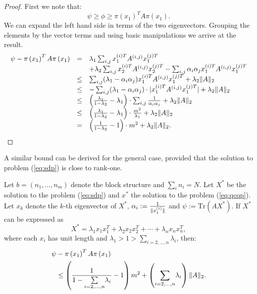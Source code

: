 \begin{proof}
First we note that: $$\psi \geq \phi \geq \pi\left(x_1\right)^T A \pi\left(x_1\right).$$
We can expand the left hand side in terms of the two eigenvectors. Grouping the
elements by the vector terms and using basic manipulations we arrive at the result.
\[
\begin{array}{rcl}
\psi - \pi\left(x_1\right)^T A \pi\left(x_1\right) & = & \lambda_1 \sum_{i,j} x_1^{(i)T} A^{(i,j)} x_1^{(j)T}  \\
& & + \lambda_2\sum_{i,j} x_2^{(i)T} A^{(i,j)} x_2^{(j)T} - \sum_{i,j} \alpha_i \alpha_j x_1^{(i)T} A^{(i,j)} x_1^{(j)T}   \\
&\leq & \sum_{i,j} (\lambda_1 - \alpha_i \alpha_j) x_1^{(i)T} A^{(i,j)} x_1^{(j)T}  + \lambda_2 \lVert A\rVert_2 \\
&\leq & -\sum_{i,j} (\lambda_1 - \alpha_i \alpha_j)\cdot |x_1^{(i)T} A^{(i,j)} x_1^{(j)T}| +  \lambda_2 \lVert A\rVert_2 \\
&\leq & \left(\frac{\lambda_1}{1-\lambda_2} - \lambda_1 \right)\cdot \sum_{i,j}  \frac{1}{\alpha_i \alpha_j} +  \lambda_2 \lVert A\rVert_2 \\
&\leq & \left(\frac{\lambda_1}{1-\lambda_2} - \lambda_1 \right)\cdot \frac{m^2}{\lambda_1} +  \lambda_2 \lVert A\rVert_2 \\
&= & \left(\frac{1}{1-\lambda_2} - 1 \right)\cdot m^2 +  \lambda_2 \lVert A\rVert_2.
\end{array}
\]
\end{proof}

A similar bound can be derived for the general case, provided that the solution to problem (\ref{eq:sdp}) is close to rank-one.
\begin{proposition}
Let $b = \left(n_1,\ldots,n_m\right)$ denote the block structure and $ \sum_i n_i = N $.
Let $X^*$ be the solution to the problem (\ref{eq:sdp}) and $x^{*}$ the solution to the problem (\ref{eq:qcqp}).
Let $x_k$ denote the $k$-th eigenvector of $X^*$,
$\alpha_i := \frac{1}{\lVert x_1^{(i)}\rVert}$ and
$\psi := \mathrm{Tr}\left(A X^{*}\right)$.
If $X^*$ can be expressed as
$$X^* = \lambda_1  x_1 x_1^T + \lambda_2 x_2 x_2^T + \cdots + \lambda_n x_n x_n^T,$$
where each $x_i$ has unit length and $\lambda_1 > 1 >  \underset{i=2,\ldots, n}{\sum} \lambda_i$,
 then:
\begin{align*}
\psi &- \pi\left(x_1\right)^T A \pi\left(x_1\right) \\ &\leq  \left(\frac{1}{1- \underset{i=2,\ldots, n}{\sum} \lambda_i} -1\right)  m^2 + \left(\underset{i=2,\ldots, n}{\sum} \lambda_i\right) \lVert A\rVert_2.
\end{align*}
\end{proposition}

